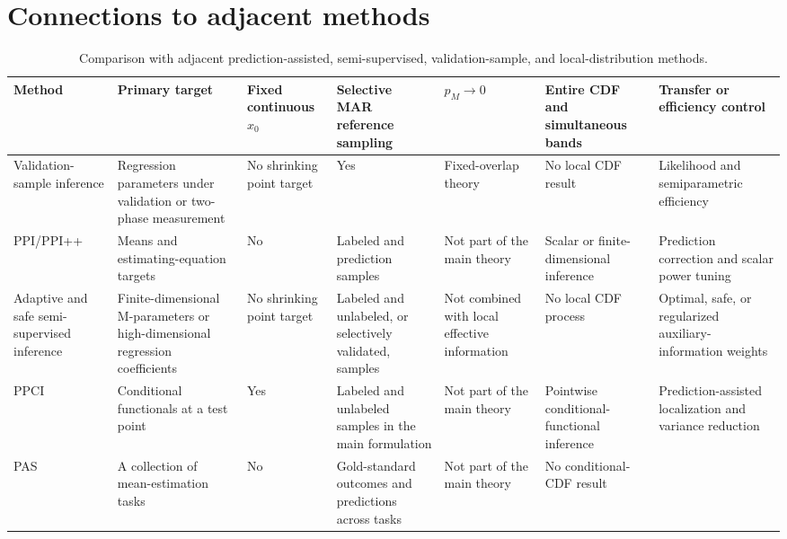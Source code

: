 \section{Connections to adjacent methods}
\label{sec:comparison}

\begin{table}[H]
\centering
\caption{Comparison with adjacent prediction-assisted, semi-supervised, validation-sample, and local-distribution methods.}
\label{tab:method-comparison}
\scriptsize
\setlength{\tabcolsep}{3.2pt}
\begin{tabular}{>{\raggedright\arraybackslash}p{1.85cm}>{\raggedright\arraybackslash}p{2.05cm}>{\raggedright\arraybackslash}p{1.25cm}>{\raggedright\arraybackslash}p{1.65cm}>{\raggedright\arraybackslash}p{1.25cm}>{\raggedright\arraybackslash}p{1.65cm}>{\raggedright\arraybackslash}p{1.75cm}}
\toprule
Method & Primary target & Fixed continuous $x_0$ & Selective MAR reference sampling & $p_M\to0$ & Entire CDF and simultaneous bands & Transfer or efficiency control\\
\midrule
Validation-sample inference \citep{Pepe1992,TaoZengLin2017}
& Regression parameters under validation or two-phase measurement
& No shrinking point target
& Yes
& Fixed-overlap theory
& No local CDF result
& Likelihood and semiparametric efficiency\\
PPI/PPI++ \citep{AngelopoulosEtAl2023,AngelopoulosDuchiZrnic2023}
& Means and estimating-equation targets
& No
& Labeled and prediction samples
& Not part of the main theory
& Scalar or finite-dimensional inference
& Prediction correction and scalar power tuning\\
Adaptive and safe semi-supervised inference \citep{SongLinZhou2024,DengEtAl2024,ChenEtAl2025}
& Finite-dimensional M-parameters or high-dimensional regression coefficients
& No shrinking point target
& Labeled and unlabeled, or selectively validated, samples
& Not combined with local effective information
& No local CDF process
& Optimal, safe, or regularized auxiliary-information weights\\
PPCI \citep{SuiEtAl2026}
& Conditional functionals at a test point
& Yes
& Labeled and unlabeled samples in the main formulation
& Not part of the main theory
& Pointwise conditional-functional inference
& Prediction-assisted localization and variance reduction\\
PAS \citep{LiIgnatiadis2025}
& A collection of mean-estimation tasks
& No
& Gold-standard outcomes and predictions across tasks
& Not part of the main theory
& No conditional-CDF result

\end{tabular}
\end{table}
